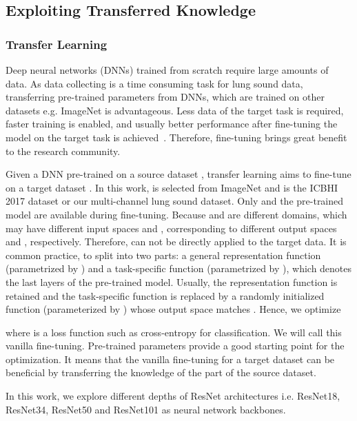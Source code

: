 \documentclass[journal]{IEEEtran}
\begin{document}
\subsection{Exploiting Transferred Knowledge}
\subsubsection{Transfer Learning}
Deep neural networks (DNNs) trained from scratch require large amounts of data. As data collecting is a time consuming task for lung sound data, transferring pre-trained parameters from DNNs, which are trained on other datasets e.g. ImageNet is advantageous. Less data of the target task is required, faster training is enabled, and usually better performance after fine-tuning the model on the target task is achieved~\cite{he2019rethinking}. Therefore, fine-tuning brings great benefit to the research community.   

Given a DNN  pre-trained on a source dataset , transfer learning aims to fine-tune  on a target dataset . In this work,  is selected from ImageNet and  is the ICBHI 2017 dataset or our multi-channel lung sound dataset. Only  and the pre-trained model  are available during fine-tuning. 
Because  and  are different domains, which may have different input spaces  and  , corresponding to different output spaces  and  , respectively. Therefore,  can not be directly applied to the target data. It is common practice, to split  into two parts: a general representation function  (parametrized by ) and a task-specific function  (parametrized by ), which denotes the last layers of the pre-trained model. Usually, the representation function is retained and the task-specific function is replaced by a randomly initialized function  (parameterized by ) whose output space matches . Hence, we optimize 

where  is a loss function such as cross-entropy for classification. We will call this vanilla fine-tuning. Pre-trained parameters  provide a good starting point for the optimization. It means that the vanilla fine-tuning for a target dataset can be beneficial by transferring the knowledge of the part  of the source dataset.

In this work, we explore different depths of ResNet architectures i.e. ResNet18,  ResNet34,  ResNet50 and  ResNet101 as neural network backbones.
\end{document}
